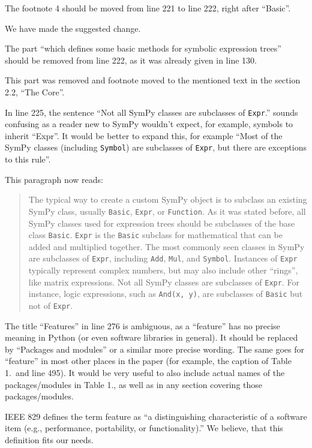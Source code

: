 \documentclass[answers,12pt]{exam}
\begin{document}
\begin{questions}
\question The footnote 4 should be moved from line 221 to line 222, right after ``Basic''.
\label{rev3point16}
\begin{solution}
We have made the suggested change.
\end{solution}

\question The part ``which defines some basic methods for symbolic expression trees'' should be removed from line 222, as it was already given in line 130.
\begin{solution}
This part was removed and footnote moved to the mentioned
text in the section 2.2, ``The Core''.
\end{solution}

\question In line 225, the sentence ``Not all SymPy classes are subclasses of \texttt{Expr}.'' sounds confusing as a reader new to SymPy wouldn't expect, for example, symbols to inherit ``Expr''. It would be better to expand this, for example ``Most of the SymPy classes (including \texttt{Symbol}) are subclasses of \texttt{Expr}, but there are exceptions to this rule''.
\begin{solution}
This paragraph now reads:
\begin{quote}
The typical way to create a custom SymPy object is to subclass an existing
SymPy class, usually \texttt{Basic}, \texttt{Expr}, or \texttt{Function}. As
it was stated before, all SymPy classes used for expression trees should be
subclasses of the base class \texttt{Basic}. \texttt{Expr} is the
\texttt{Basic} subclass for mathematical that can be added and multiplied
together. The most commonly seen classes in SymPy are subclasses of
\texttt{Expr}, including \texttt{Add}, \texttt{Mul}, and \texttt{Symbol}.
Instances of \texttt{Expr} typically represent complex numbers, but may also
include other ``rings'', like matrix expressions. Not all SymPy classes are
subclasses of \texttt{Expr}. For instance, logic expressions, such as
\verb|And(x, y)|, are subclasses of \texttt{Basic} but not of \texttt{Expr}.
\end{quote}
\end{solution}

\question The title ``Features'' in line 276 is ambiguous, as a ``feature''
has no precise meaning in Python (or even software libraries in general). It
should be replaced by ``Packages and modules'' or a similar more precise
wording. The same goes for ``feature'' in most other places in the paper (for
example, the caption of Table 1.\ and line 495). It would be very useful to also include actual names of the packages/modules in Table 1., as well as in any section covering those packages/modules.
\begin{solution}
IEEE 829 defines the term feature as ``a distinguishing
characteristic of a software item (e.g., performance, portability,
or functionality).''  We believe, that this definition fits our needs.


\end{solution}
\end{questions}
\end{document}
